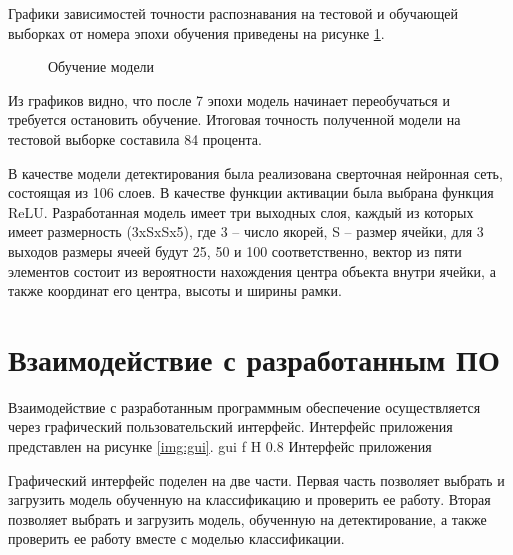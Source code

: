 Графики зависимостей точности распознавания на тестовой и обучающей выборках от номера эпохи обучения приведены на рисунке \ref{img:model_training}.

\begin{figure}[H]
	\begin{center}
		\caption{Обучение модели}
		\label{img:model_training}
	\end{center}
\end{figure}

Из графиков видно, что после 7 эпохи модель начинает переобучаться и требуется остановить обучение. Итоговая точность полученной модели на тестовой выборке составила 84 процента.

В качестве модели детектирования была реализована сверточная нейронная сеть, состоящая из 106 слоев. В качестве функции активации была выбрана функция ReLU. Разработанная модель имеет три выходных слоя, каждый из которых имеет размерность (3xSxSx5), где 3 -- число якорей, S -- размер ячейки, для 3 выходов размеры ячеей будут 25, 50 и 100 соответственно, вектор из пяти элементов состоит из вероятности нахождения центра объекта внутри ячейки, а также координат его центра, высоты и ширины рамки.


\section{Взаимодействие с разработанным ПО}

Взаимодействие с разработанным программным обеспечение осуществляется через графический пользовательский интерфейс. Интерфейс приложения представлен на рисунке \ref{img:gui}.
{gui} %
{f} %
{H} %
{0.8\textwidth} %
{Интерфейс приложения} %

Графический интерфейс поделен на две части. Первая часть позволяет выбрать и загрузить модель обученную на классификацию и проверить ее работу. Вторая позволяет выбрать и загрузить модель, обученную на детектирование, а также проверить ее работу вместе с моделью классификации.

